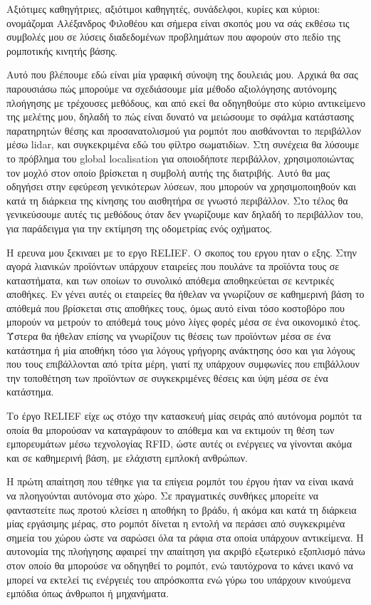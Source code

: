 \documentclass[a4paper,10pt]{article}
\begin{document}
Αξιότιμες καθηγήτριες, αξιότιμοι καθηγητές, συνάδελφοι, κυρίες και κύριοι:
ονομάζομαι Αλέξανδρος Φιλοθέου και σήμερα είναι σκοπός μου να σάς εκθέσω τις
συμβολές μου σε λύσεις διαδεδομένων προβλημάτων που αφορούν στο πεδίο της
ρομποτικής κινητής βάσης.

Αυτό που βλέπουμε εδώ είναι μία γραφική σύνοψη της δουλειάς μου.  Αρχικά θα σας
παρουσιάσω πώς μπορούμε να σχεδιάσουμε μία μέθοδο αξιολόγησης αυτόνομης
πλοήγησης με τρέχουσες μεθόδους, και από εκεί θα οδηγηθούμε στο κύριο
αντικείμενο της μελέτης μου, δηλαδή το πώς είναι δυνατό να μειώσουμε το σφάλμα
κατάστασης παρατηρητών θέσης και προσανατολισμού για ρομπότ που αισθάνονται το
περιβάλλον μέσω lidar, και συγκεκριμένα εδώ του φίλτρο σωματιδίων. Στη συνέχεια
θα λύσουμε το πρόβλημα του global localisation για οποιοδήποτε περιβάλλον,
χρησιμοποιώντας τον μοχλό στον οποίο βρίσκεται η συμβολή αυτής της διατριβής.
Αυτό θα μας οδηγήσει στην εφεύρεση γενικότερων λύσεων, που μπορούν να
χρησιμοποιηθούν και κατά τη διάρκεια της κίνησης του αισθητήρα σε γνωστό
περιβάλλον. Στο τέλος θα γενικεύσουμε αυτές τις μεθόδους όταν δεν γνωρίζουμε
καν δηλαδή το περιβάλλον του, για παράδειγμα για την εκτίμηση της οδομετρίας
ενός οχήματος.

Η ερευνα μου ξεκιναει με το εργο RELIEF. Ο σκοπος του εργου ηταν ο εξης. Στην
αγορά λιανικών προϊόντων υπάρχουν εταιρείες που πουλάνε τα προϊόντα τους σε
καταστήματα, και των οποίων το συνολικό απόθεμα αποθηκεύεται σε κεντρικές
αποθήκες. Εν γένει αυτές οι εταιρείες θα ήθελαν να γνωρίζουν σε καθημερινή βάση
το απόθεμά που βρίσκεται στις αποθήκες τους, όμως αυτό είναι τόσο κοστοβόρο που
μπορούν να μετρούν το απόθεμά τους μόνο λίγες φορές μέσα σε ένα οικονομικό
έτος. Ύστερα θα ήθελαν επίσης να γνωρίζουν τις θέσεις των προϊόντων μέσα σε ένα
κατάστημα ή μία αποθήκη τόσο για λόγους γρήγορης ανάκτησης όσο και για λόγους
που τους επιβάλλονται από τρίτα μέρη, γιατί πχ υπάρχουν συμφωνίες που
επιβάλλουν την τοποθέτηση των προϊόντων σε συγκεκριμένες θέσεις και ύψη μέσα σε
ένα κατάστημα.

Το έργο RELIEF είχε ως στόχο την κατασκευή μίας σειράς από αυτόνομα ρομπότ τα
οποία θα μπορούσαν να καταγράφουν το απόθεμα και να εκτιμούν τη θέση των
εμπορευμάτων μέσω τεχνολογίας RFID, ώστε αυτές οι ενέργειες να γίνονται ακόμα
και σε καθημερινή βάση, με ελάχιστη εμπλοκή ανθρώπων.

Η πρώτη απαίτηση που τέθηκε για τα επίγεια ρομπότ του έργου ήταν να είναι ικανά
να πλοηγούνται αυτόνομα στο χώρο. Σε πραγματικές συνθήκες μπορείτε να
φανταστείτε πως προτού κλείσει η αποθήκη το βράδυ, ή ακόμα και κατά τη διάρκεια
μίας εργάσιμης μέρας, στο ρομπότ δίνεται η εντολή να περάσει από συγκεκριμένα
σημεία του χώρου ώστε να σαρώσει όλα τα ράφια στα οποία υπάρχουν αντικείμενα.
Η αυτονομία της πλοήγησης αφαιρεί την απαίτηση για ακριβό εξωτερικό εξοπλισμό
πάνω στον οποίο θα μπορούσε να οδηγηθεί το ρομπότ, ενώ ταυτόχρονα το κάνει
ικανό να μπορεί να εκτελεί τις ενέργειές του απρόσκοπτα ενώ γύρω του υπάρχουν
κινούμενα εμπόδια όπως άνθρωποι ή μηχανήματα.
\end{document}
